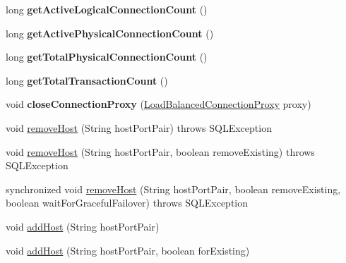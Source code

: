 \begin{DoxyCompactItemize}
\mbox{\label{classcom_1_1mysql_1_1jdbc_1_1_connection_group_a05525d44b09a0cff417714cdd68d8389}} 
long {\bfseries get\+Active\+Logical\+Connection\+Count} ()
\item 
\mbox{\label{classcom_1_1mysql_1_1jdbc_1_1_connection_group_a5411acb4feff8b4214dc57497d5f24a4}} 
long {\bfseries get\+Active\+Physical\+Connection\+Count} ()
\item 
\mbox{\label{classcom_1_1mysql_1_1jdbc_1_1_connection_group_a2c4f6dffe1af27a4931e42f451e0626d}} 
long {\bfseries get\+Total\+Physical\+Connection\+Count} ()
\item 
\mbox{\label{classcom_1_1mysql_1_1jdbc_1_1_connection_group_a8b5d4cbf84c07ec1cde02bdcd8605563}} 
long {\bfseries get\+Total\+Transaction\+Count} ()
\item 
\mbox{\label{classcom_1_1mysql_1_1jdbc_1_1_connection_group_adf86915b8ef7962c6c9982dd8d4e7541}} 
void {\bfseries close\+Connection\+Proxy} (\mbox{\hyperlink{classcom_1_1mysql_1_1jdbc_1_1_load_balanced_connection_proxy}{Load\+Balanced\+Connection\+Proxy}} proxy)
\item 
void \mbox{\hyperlink{classcom_1_1mysql_1_1jdbc_1_1_connection_group_ae0d6740efd41c535f64998acbf213a54}{remove\+Host}} (String host\+Port\+Pair)  throws S\+Q\+L\+Exception 
\item 
void \mbox{\hyperlink{classcom_1_1mysql_1_1jdbc_1_1_connection_group_ac1cffa2544420e1e0304129257c97a91}{remove\+Host}} (String host\+Port\+Pair, boolean remove\+Existing)  throws S\+Q\+L\+Exception 
\item 
synchronized void \mbox{\hyperlink{classcom_1_1mysql_1_1jdbc_1_1_connection_group_a27586faf64da09b716633d8af113a9ba}{remove\+Host}} (String host\+Port\+Pair, boolean remove\+Existing, boolean wait\+For\+Graceful\+Failover)  throws S\+Q\+L\+Exception 
\item 
void \mbox{\hyperlink{classcom_1_1mysql_1_1jdbc_1_1_connection_group_a3d7277b9513c4f9f7e98a62bbe6c6b4d}{add\+Host}} (String host\+Port\+Pair)
\item 
void \mbox{\hyperlink{classcom_1_1mysql_1_1jdbc_1_1_connection_group_a26394f92e59f213c787876133b0a17e5}{add\+Host}} (String host\+Port\+Pair, boolean for\+Existing)
\end{DoxyCompactItemize}


